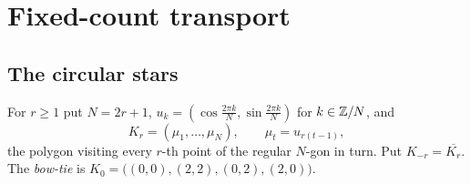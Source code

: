 \section{Fixed-count transport}\label{sec:transport}

\subsection{The circular stars}

\begin{definition}\label{def:star}
For $r\geq1$ put $N=2r+1$, $u_k=(\cos\frac{2\pi k}N,\sin\frac{2\pi k}N)$ for
$k\in\mathbb Z/N$, and
\[
K_r=(\mu_1,\ldots,\mu_N),\qquad \mu_t=u_{r(t-1)},
\]
the polygon visiting every $r$-th point of the regular $N$-gon in turn. Put
$K_{-r}=\overline{K_r}$. The \emph{bow-tie} is
$K_0=\bigl((0,0),(2,2),(0,2),(2,0)\bigr)$.
\end{definition}

